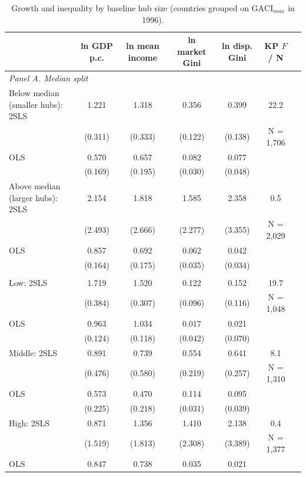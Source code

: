 \begin{table}[p]
\centering
\caption{Growth and inequality by baseline hub size (countries grouped on $\mathrm{GACI}_{max}$ in 1996).}
\label{tab:growth_ineq}
\begin{threeparttable}
\footnotesize
\begin{tabular}{lcccccc}
\toprule
 & ln GDP p.c. & ln mean income & ln market Gini & ln disp. Gini & KP $F$ / N \\
\midrule
\multicolumn{6}{l}{\emph{Panel A. Median split}}\\
Below median (smaller hubs): 2SLS & 1.221\sym{***} & 1.318\sym{***} & 0.356\sym{***} & 0.399\sym{***} & 22.2 \\
 & (0.311) & (0.333) & (0.122) & (0.138) & N = 1{,}706 \\
\quad OLS & 0.570\sym{***} & 0.657\sym{***} & 0.082\sym{***} & 0.077 & \\
 & (0.169) & (0.195) & (0.030) & (0.048) & \\
Above median (larger hubs): 2SLS & 2.154 & 1.818 & 1.585 & 2.358 & 0.5 \\
 & (2.493) & (2.666) & (2.277) & (3.355) & N = 2{,}029 \\
\quad OLS & 0.857\sym{***} & 0.692\sym{***} & 0.062\sym{*} & 0.042 & \\
 & (0.164) & (0.175) & (0.035) & (0.034) & \\
\addlinespace
\multicolumn{6}{l}{\emph{Panel B. Terciles}}\\
Low: 2SLS & 1.719\sym{***} & 1.520\sym{***} & 0.122 & 0.152 & 19.7 \\
 & (0.384) & (0.307) & (0.096) & (0.116) & N = 1{,}048 \\
\quad OLS & 0.963\sym{***} & 1.034\sym{***} & 0.017 & 0.021 & \\
 & (0.124) & (0.118) & (0.042) & (0.070) & \\
Middle: 2SLS & 0.891\sym{*} & 0.739 & 0.554\sym{**} & 0.641\sym{**} & 8.1 \\
 & (0.476) & (0.580) & (0.219) & (0.257) & N = 1{,}310 \\
\quad OLS & 0.573\sym{**} & 0.470\sym{**} & 0.114\sym{***} & 0.095\sym{**} & \\
 & (0.225) & (0.218) & (0.031) & (0.039) & \\
High: 2SLS & 0.871 & 1.356 & 1.410 & 2.138 & 0.4 \\
 & (1.519) & (1.813) & (2.308) & (3.389) & N = 1{,}377 \\
\quad OLS & 0.847\sym{***} & 0.738\sym{***} & 0.035 & 0.021 & \\

\end{tabular}
\end{threeparttable}
\end{table}
